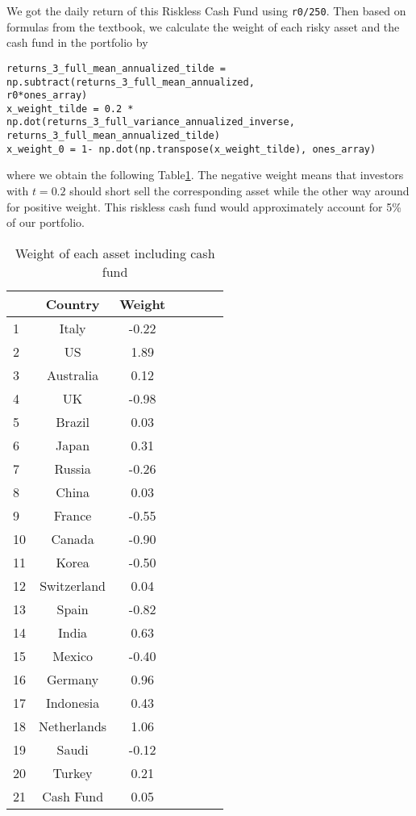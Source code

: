 \documentclass[
]{article}
\begin{document}
\label{tp_w_weight_tilde} We got the daily return of this Riskless Cash
Fund using \texttt{r0/250}. Then based on formulas from the textbook, we
calculate the weight of each risky asset and the cash fund in the
portfolio by

\begin{verbatim}
returns_3_full_mean_annualized_tilde = np.subtract(returns_3_full_mean_annualized,
r0*ones_array)
x_weight_tilde = 0.2 * np.dot(returns_3_full_variance_annualized_inverse,
returns_3_full_mean_annualized_tilde)
x_weight_0 = 1- np.dot(np.transpose(x_weight_tilde), ones_array)
\end{verbatim}

where we obtain the following Table\ref{x_weight_tilde_plus0}. The
negative weight means that investors with \(t=0.2\) should short sell
the corresponding asset while the other way around for positive weight.
This riskless cash fund would approximately account for 5\% of our
portfolio.

\begin{table}[!htb]
\centering
{\begin{tabular}{lcccccc} 
  \hline
 & Country & Weight \\ 
  \hline
1 & Italy & -0.22 \\ 
  2 & US & 1.89 \\ 
  3 & Australia & 0.12 \\ 
  4 & UK & -0.98 \\ 
  5 & Brazil & 0.03 \\ 
  6 & Japan & 0.31 \\ 
  7 & Russia & -0.26 \\ 
  8 & China & 0.03 \\ 
  9 & France & -0.55 \\ 
  10 & Canada & -0.90 \\ 
  11 & Korea & -0.50 \\ 
  12 & Switzerland & 0.04 \\ 
  13 & Spain & -0.82 \\ 
  14 & India & 0.63 \\ 
  15 & Mexico & -0.40 \\ 
  16 & Germany & 0.96 \\ 
  17 & Indonesia & 0.43 \\ 
  18 & Netherlands & 1.06 \\ 
  19 & Saudi & -0.12 \\ 
  20 & Turkey & 0.21 \\ 
  21 & Cash Fund & 0.05 \\ 
   \hline
\end{tabular}
\caption{Weight of each asset including cash fund}}
\label{x_weight_tilde_plus0}
\end{table}
\end{document}
